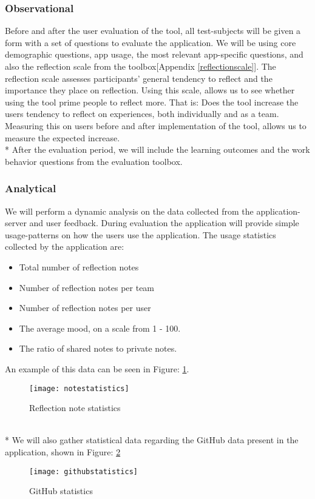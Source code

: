 \subsubsection{Observational}
Before and after the user evaluation of the tool, all test-subjects will be given a form with a set of questions to evaluate the application. We will be using core demographic questions, app usage, the most relevant app-specific questions, and also the reflection scale from the toolbox[Appendix \ref{reflectionscale}]. The reflection scale assesses participants' general tendency to reflect and the importance they place on reflection. Using this scale, allows us to see whether using the tool prime people to reflect more. That is: Does the tool increase the users tendency to reflect on experiences, both individually and as a team. Measuring this on users before and after implementation of the tool, allows us to measure the expected increase. \\*
After the evaluation period,  we will include the learning outcomes and the work behavior questions from the evaluation toolbox.

\subsubsection{Analytical}
We will perform a dynamic analysis on the data collected from the application-server and user feedback. During evaluation the application will provide simple usage-patterns on how the users use the application. The usage statistics collected by the application are: 
\begin{itemize}
\item Total number of reflection notes
\item Number of reflection notes per team
\item Number of reflection notes per user
\item The average mood, on a scale from 1 - 100.
\item The ratio of shared notes to private notes. 
\end{itemize}
An example of this data can be seen in Figure: \ref{notestatistics}. 
\begin{figure}[!htpb]
\centering
	\texttt{[image: notestatistics]}
\caption{Reflection note statistics}
\label{notestatistics}
\end{figure}
\\*
We will also gather statistical data regarding the GitHub data present in the application, shown in Figure: \ref{githubstatistics}
\begin{figure}[!htpb]
\centering
	\texttt{[image: githubstatistics]}
\caption{GitHub statistics}
\label{githubstatistics}
\end{figure}

